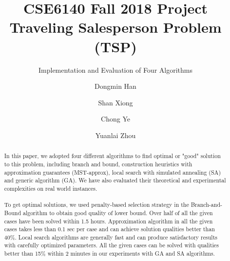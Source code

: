 \documentclass[sigconf, nonacm=true, natbib=true]{acmart}
\begin{document}
\title{CSE6140 Fall 2018 Project \\Traveling Salesperson Problem (TSP)}
\subtitle{Implementation and Evaluation of
Four Algorithms}


\author{Dongmin Han}

\author{Shan Xiong}

\author{Chong Ye}

\author{Yuanlai Zhou}

\begin{abstract}
In this paper, we adopted four different algorithms to find optimal or "good" solution to this problem, including branch and bound, construction heuristics with approximation guarantees (MST-approx), local search with simulated annealing (SA) and generic algorithm (GA). We have also evaluated their theoretical and experimental complexities on real world instances. \\
\hfill\\
To get optimal solutions, we used penalty-based selection strategy in the Branch-and-Bound algorithm to obtain good quality of lower bound. Over half of all the given cases have been solved within 1.5 hours. Approximation algorithm in all the given cases takes less than 0.1 sec per case and can achieve solution qualities better than 40\%. Local search algorithms are generally fast and can produce satisfactory results with carefully optimized parameters. All the given cases can be solved with qualities better than 15\% within 2 minutes in our experiments with GA and SA algorithms.  
\\

\end{abstract}
\end{document}

